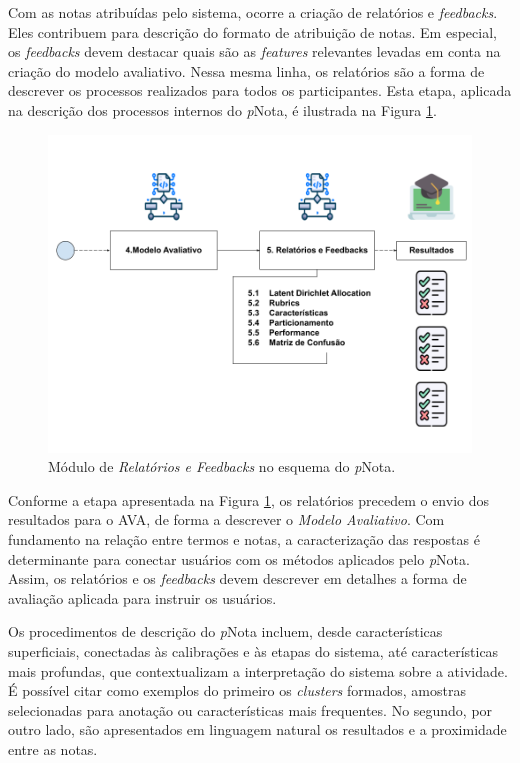 Com as notas atribuídas pelo sistema, ocorre a criação de relatórios e \textit{feedbacks}. Eles contribuem para descrição do formato de atribuição de notas. Em especial, os \textit{feedbacks} devem destacar quais são as \textit{features} relevantes levadas em conta na criação do modelo avaliativo. Nessa mesma linha, os relatórios são a forma de descrever os processos realizados para todos os participantes. Esta etapa, aplicada na descrição dos processos internos do \textit{p}Nota, é ilustrada na Figura \ref{fig-rf}. 

\begin{figure}[!h]
\centering
\includegraphics[width=\textwidth]{figuras/esquema-rf-pNota.png}
\caption{Módulo de \textit{Relatórios e Feedbacks} no esquema do \textit{p}Nota.}
\label{fig-rf}
\end{figure}


Conforme a etapa apresentada na Figura \ref{fig-rf}, os relatórios precedem o envio dos resultados para o AVA, de forma a descrever o \textit{Modelo Avaliativo}. Com fundamento na relação entre termos e notas, a caracterização das respostas é determinante para conectar usuários com os métodos aplicados pelo \textit{p}Nota. Assim, os relatórios e os \textit{feedbacks} devem descrever em detalhes a forma de avaliação aplicada para instruir os usuários.

Os procedimentos de descrição do \textit{p}Nota incluem, desde características superficiais, conectadas às calibrações e às etapas do sistema, até características mais profundas, que contextualizam a interpretação do sistema sobre a atividade. É possível citar como exemplos do primeiro os \textit{clusters} formados, amostras selecionadas para anotação ou características mais frequentes. No segundo, por outro lado, são apresentados em linguagem natural os resultados e a proximidade entre as notas.


